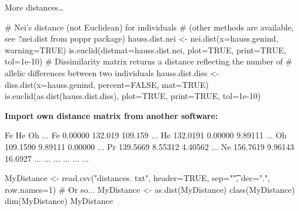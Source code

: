\documentclass[compress, ucs, xelatex, 11pt, xcolor=svgnames, aspectratio=169,
	hyperref={
		bookmarks=true,
		unicode=true,
		colorlinks=true,
		pdftitle={Molecular data in R},
		plainpages=false,
		pdfauthor={Vojtech Zeisek},
		pdfsubject={Course about phylogeny and evolution in R},
		pdfcreator={XeLaTeX},
		pdfkeywords={R, evolution, phylogeny, molecular data},
		linkcolor=Crimson, %
		anchorcolor=Magenta, %
		citecolor=Magenta, %
		filecolor=Magenta, %
		menucolor=Magenta, %
		urlcolor=DodgerBlue, %
		pdftex},
	url={hyphens, lowtilde} %
	]{beamer}
\begin{document}
\begin{frame}[fragile]{More distances\ldots}
	\begin{spluscode}
    # Nei's distance (not Euclidean) for individuals
    # (other methods are available, see ?nei.dist from poppr package)
    hauss.dist.nei <- nei.dist(x=hauss.genind, warning=TRUE)
    is.euclid(distmat=hauss.dist.nei, plot=TRUE, print=TRUE, tol=1e-10)
    # Dissimilarity matrix returns a distance reflecting the number of
    # allelic differences between two individuals
    hauss.dist.diss <- diss.dist(x=hauss.genind, percent=FALSE, mat=TRUE)
    is.euclid(as.dist(hauss.dist.diss), plot=TRUE, print=TRUE, tol=1e-10)
	\end{spluscode}
	\vfill
	\textbf{Import own distance matrix from another software:}
	\begin{multicols}{2}
		\begin{spluscode}
       Fe       He      Oh      ...
    Fe 0.00000  132.019 109.159 ...
    He 132.0191 0.00000 9.89111 ...
    Oh 109.1590 9.89111 0.00000 ...
    Pr 139.5669 8.55312 4.40562 ...
    Ne 156.7619 9.96143 16.6927 ...
    ... ...     ...     ...     ...
		\end{spluscode}
		\columnbreak
		\begin{spluscode}
    MyDistance <- read.csv("distances.
      txt", header=TRUE, sep="\t",
      dec=".", row.names=1) # Or so...
    MyDistance <- as.dist(MyDistance)
    class(MyDistance)
    dim(MyDistance)
    MyDistance
		\end{spluscode}
	\end{multicols}
\end{frame}
\end{document}
